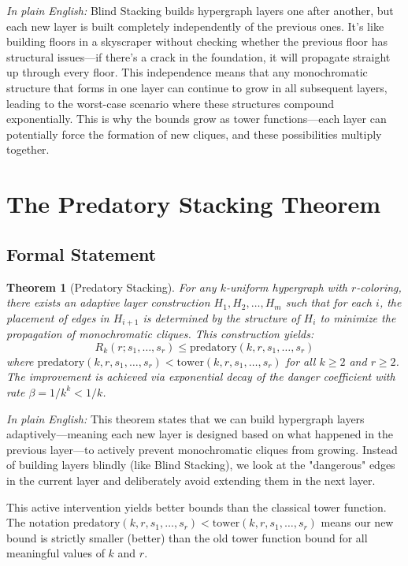 \documentclass[12pt]{article}
\newtheorem{theorem}{Theorem}
\begin{document}
\textit{In plain English:} Blind Stacking builds hypergraph layers one after another, but each new layer is built completely independently of the previous ones. It's like building floors in a skyscraper without checking whether the previous floor has structural issues—if there's a crack in the foundation, it will propagate straight up through every floor. This independence means that any monochromatic structure that forms in one layer can continue to grow in all subsequent layers, leading to the worst-case scenario where these structures compound exponentially. This is why the bounds grow as tower functions—each layer can potentially force the formation of new cliques, and these possibilities multiply together.

\section{The Predatory Stacking Theorem}

\subsection{Formal Statement}

\begin{theorem}[Predatory Stacking]
For any $k$-uniform hypergraph with $r$-coloring, there exists an adaptive layer construction $H_1, H_2, \ldots, H_m$ such that for each $i$, the placement of edges in $H_{i+1}$ is determined by the structure of $H_i$ to minimize the propagation of monochromatic cliques. This construction yields:
\begin{equation}
R_k(r; s_1, \ldots, s_r) \leq \text{predatory}(k, r, s_1, \ldots, s_r)
\end{equation}
where $\text{predatory}(k, r, s_1, \ldots, s_r) < \text{tower}(k, r, s_1, \ldots, s_r)$ for all $k \geq 2$ and $r \geq 2$. The improvement is achieved via exponential decay of the danger coefficient with rate $\beta = 1/k^k < 1/k$.
\end{theorem}

\textit{In plain English:} This theorem states that we can build hypergraph layers adaptively—meaning each new layer is designed based on what happened in the previous layer—to actively prevent monochromatic cliques from growing. Instead of building layers blindly (like Blind Stacking), we look at the "dangerous" edges in the current layer and deliberately avoid extending them in the next layer.

This active intervention yields better bounds than the classical tower function. The notation $\text{predatory}(k, r, s_1, \ldots, s_r) < \text{tower}(k, r, s_1, \ldots, s_r)$ means our new bound is strictly smaller (better) than the old tower function bound for all meaningful values of $k$ and $r$.
\end{document}
